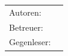 \begin{titlepage}
\begin{center}
	\vspace{1ex}
	\LARGE 
	\place
	
	\vspace{5ex}
	\begin{framed}
		\timeperiod
	\end{framed}
\end{center}

\vspace{11ex}
\begin{tabular}{ll} %
	Autoren:        & \authors    \\
	Betreuer:        & \advisor    \\
	Gegenleser:        & \tbd \revisor     \\
\end{tabular}

\end{titlepage}

\restoregeometry %
